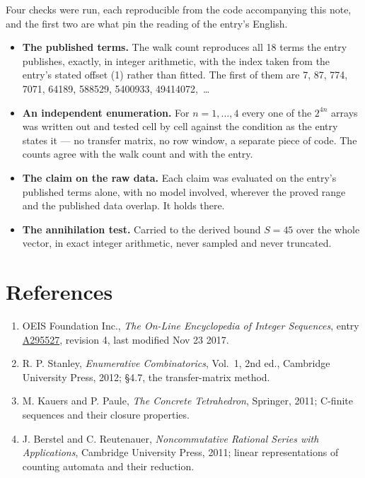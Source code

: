 \documentclass[11pt]{article}
\theoremstyle{definition}
\begin{document}
Four checks were run, each reproducible from the code accompanying this note, and the first two are what pin the reading of the entry's English.

\begin{itemize}

\item {\bfseries The published terms.} The walk count reproduces all 18 terms the entry publishes, exactly, in integer arithmetic, with the index taken from the entry's stated offset (1) rather than fitted. The first of them are 7, 87, 774, 7071, 64189, 588529, 5400933, 49414072,~\dots

\item {\bfseries An independent enumeration.} For $n = 1,\dots,4$ every one of the $2^{4n}$ arrays was written out and tested cell by cell against the condition as the entry states it --- no transfer matrix, no row window, a separate piece of code. The counts agree with the walk count and with the entry.

\item {\bfseries The claim on the raw data.} Each claim was evaluated on the entry's published terms alone, with no model involved, wherever the proved range and the published data overlap. It holds there.

\item {\bfseries The annihilation test.} Carried to the derived bound $S = 45$ over the whole vector, in exact integer arithmetic, never sampled and never truncated.

\end{itemize}

\section{References}

\begin{enumerate}

\item OEIS Foundation Inc., \emph{The On-Line Encyclopedia of Integer Sequences}, entry \href{https://oeis.org/A295527}{A295527}, revision 4, last modified Nov 23 2017.

\item R. P. Stanley, \emph{Enumerative Combinatorics}, Vol.~1, 2nd ed., Cambridge University Press, 2012; \S4.7, the transfer-matrix method.

\item M. Kauers and P. Paule, \emph{The Concrete Tetrahedron}, Springer, 2011; C-finite sequences and their closure properties.

\item J. Berstel and C. Reutenauer, \emph{Noncommutative Rational Series with Applications}, Cambridge University Press, 2011; linear representations of counting automata and their reduction.

\end{enumerate}
\end{document}
